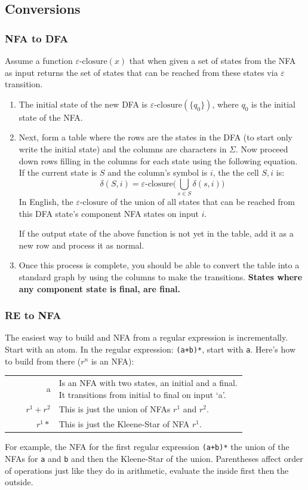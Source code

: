 \subsection{Conversions}
\newcommand{\eclose}{\varepsilon\text{-closure}}
\subsubsection{NFA to DFA}
Assume a function $\eclose(x)$ that when given a set of states from the
NFA as input returns the set of states that can be reached from these states
via $\varepsilon$ transition.
\begin{enumerate}
    \item The initial state of the new DFA is $\eclose(\{q_0\})$, where $q_0$ is
    the initial state of the NFA.
    \item Next, form a table where the rows are the states in the DFA (to start
    only write the initial state) and the columns are characters in $\Sigma$.
    Now proceed down rows filling in the columns for each state using the following
    equation. If the current state is $S$ and the column's symbol is $i$, the
    the cell $S, i$ is:
    \[
        \delta(S, i) = \eclose\big(\bigcup_{s \in S} \delta(s, i)\big)
    \]
    In English, the $\eclose$ of the union of all states that can be reached 
    from this DFA state's component NFA states on input $i$.

    If the output state of the above function is not yet in the table, add it
    as a new row and process it as normal.
    \item Once this process is complete, you should be able to convert the
    table into a standard graph by using the columns to make the transitions.
    \textbf{States where any component state is final, are final.}
\end{enumerate}
\subsubsection{RE to NFA}
The easiest way to build and NFA from a regular expression is incrementally. Start
with an atom. In the regular expression: \verb|(a+b)*|, start with \verb|a|. Here's
how to build from there ($r^n$ is an NFA):
\begin{tabular}{rp{0.79\linewidth}}
a & Is an NFA with two states, an initial and a final. It transitions from initial
    to final on input `a'. \\
$r^1 + r^2$ & This is just the union of NFAs $r^1$ and $r^2$. \\
$r^1*$ & This is just the Kleene-Star of NFA $r^1$. \\
\end{tabular}
For example, the NFA for the first
regular expression \verb|(a+b)*| the union of the NFAs for \verb|a| and \verb|b|
and then the Kleene-Star of the union. Parentheses affect order of operations
just like they do in arithmetic, evaluate the inside first then the outside.

